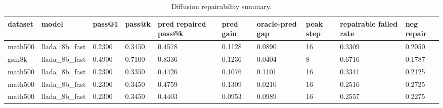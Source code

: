 \begin{table}[t]
\centering
\caption{Diffusion repairability summary.}
\label{tab:diffusion-repairability}
\begin{tabular}{llllllllll}
\hline
dataset & model & pass@1 & pass@k & pred repaired pass@k & pred gain & oracle-pred gap & peak step & repairable failed rate & neg repair \\
\hline
math500 & llada_8b_fast & 0.2300 & 0.3450 & 0.4578 & 0.1128 & 0.0890 & 16 & 0.3309 & 0.2050 \\
gsm8k & llada_8b_fast & 0.4900 & 0.7100 & 0.8336 & 0.1236 & 0.0404 & 8 & 0.6716 & 0.1787 \\
math500 & llada_8b_fast & 0.2300 & 0.3350 & 0.4426 & 0.1076 & 0.1101 & 16 & 0.3341 & 0.2125 \\
math500 & llada_8b_fast & 0.2300 & 0.3450 & 0.4759 & 0.1309 & 0.0210 & 16 & 0.2516 & 0.2725 \\
math500 & llada_8b_fast & 0.2300 & 0.3450 & 0.4403 & 0.0953 & 0.0989 & 16 & 0.2557 & 0.2275 \\
\hline
\end{tabular}
\end{table}
